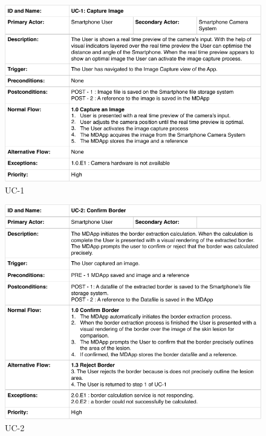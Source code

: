         \begin{figure}[H]
            \centering
            \includegraphics[width=\textwidth]{assets/requirements/uc/usecase_01.pdf}
            \caption{UC-1}
            \label{fig:uc-1}
        \end{figure}
        \begin{figure}[H]
            \centering
            \includegraphics[width=\textwidth]{assets/requirements/uc/usecase_02.pdf}
            \caption{UC-2}
            \label{fig:uc-2}
        \end{figure}
